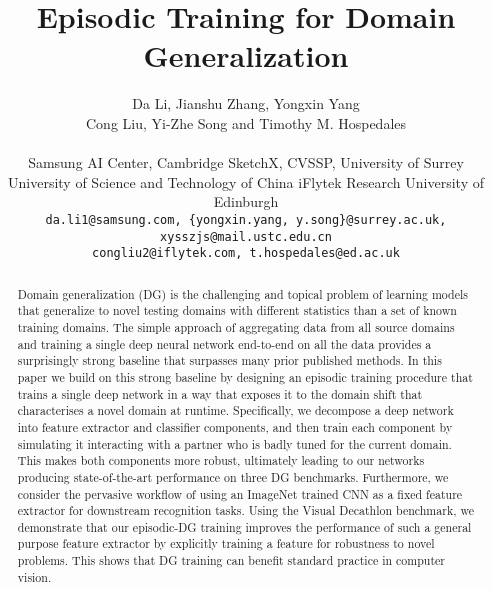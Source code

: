 \documentclass[10pt,twocolumn,letterpaper]{article}
\begin{document}
\title{Episodic Training for Domain Generalization}

\author{Da Li, Jianshu Zhang, Yongxin Yang \\
Cong Liu, Yi-Zhe Song and Timothy M. Hospedales\\
\\
Samsung AI Center, Cambridge \quad
SketchX, CVSSP, University of Surrey \\
University of Science and Technology of China \quad
iFlytek Research \quad
University of Edinburgh \\
{\tt\small da.li1@samsung.com, \{yongxin.yang, y.song\}@surrey.ac.uk, xysszjs@mail.ustc.edu.cn} \\
{\tt\small congliu2@iflytek.com, t.hospedales@ed.ac.uk} 
}

\maketitle



\begin{abstract}
Domain generalization (DG) is the challenging and topical problem of learning models that generalize to novel testing domains with different statistics than a set of known training domains. The simple approach of aggregating data from all source domains and training a single deep neural network end-to-end on all the data provides a surprisingly strong baseline that surpasses many prior published methods. In this paper we build on this strong baseline by designing an episodic training procedure that trains a single deep network in a way that exposes it to the domain shift that characterises a novel domain at runtime. Specifically, we decompose a deep network into feature extractor and classifier components, and then train each component by simulating it interacting with a partner who is badly tuned for the current domain. This makes both components more robust, ultimately leading to our networks producing state-of-the-art performance on three DG benchmarks. Furthermore, we consider the pervasive workflow of using an ImageNet trained CNN as a fixed feature extractor for downstream recognition tasks. Using the Visual Decathlon benchmark, we demonstrate that our episodic-DG training improves the performance of such a general purpose feature extractor by explicitly training a feature for robustness to novel problems. This shows that DG training can benefit standard practice in computer vision.
\end{abstract}
\end{document}
